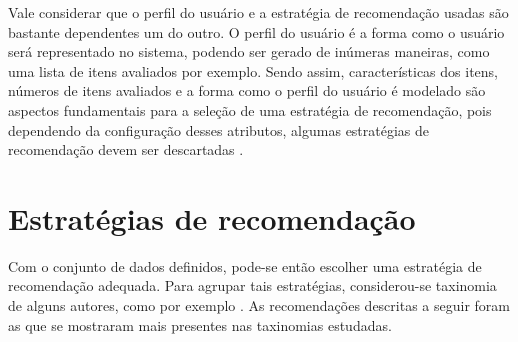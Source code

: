 Vale considerar que o perfil do usuário e a estratégia de recomendação usadas
são bastante dependentes um do outro. O perfil do usuário é a forma como o
usuário será representado no sistema, podendo ser gerado de inúmeras maneiras,
como uma lista de itens avaliados por exemplo. Sendo assim, características dos itens,
números de itens avaliados e a forma como o perfil do usuário é modelado são aspectos
fundamentais para a seleção de uma estratégia de recomendação, pois dependendo
da configuração desses atributos, algumas estratégias
de recomendação devem ser descartadas \cite{picault2011get}.

\section{Estratégias de recomendação} \label{sec:estrategias_recomendacao}

Com o conjunto de dados definidos, pode-se então escolher uma estratégia de
recomendação adequada. Para agrupar tais estratégias, considerou-se taxinomia de
alguns autores, como por exemplo \cite{burke2007hybrid}. As recomendações
descritas a seguir foram as que se mostraram mais presentes nas taxinomias
estudadas.

